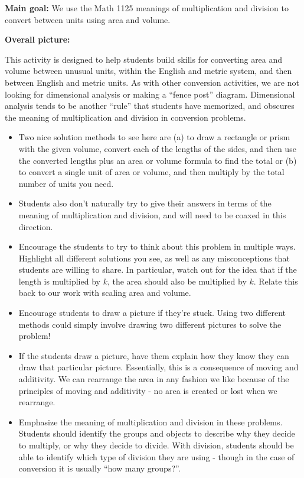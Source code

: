 \documentclass[nooutcomes,noauthor, handout]{ximera}
\begin{document}
\begin{instructorNotes}

{\bf Main goal:} We use the Math 1125 meanings of multiplication and division to convert between units using area and volume.

{\bf Overall picture:} 

This activity is designed to help students build skills for converting area and volume between unusual units, within the English and metric system, and then between English and metric units.  As with other conversion activities, we are not looking for dimensional analysis or making a ``fence post'' diagram. Dimensional analysis tends to be another ``rule'' that students have memorized, and obscures the meaning of multiplication and division in conversion problems.


\begin{itemize}
\item Two nice solution methods to see here are (a) to draw a rectangle or prism with the given volume, convert each of the lengths of the sides, and then use the converted lengths plus an area or volume formula to find the total or (b) to convert a single unit of area or volume, and then multiply by the total number of units you need.

\item Students also don't naturally try to give their answers in terms of the meaning of multiplication and division, and will need to be coaxed in this direction.

	\item Encourage the students to try to think about this problem in multiple ways.   Highlight all different solutions you see, as well as any misconceptions that students are willing to share. In particular, watch out for the idea that if the length is multiplied by $k$, the area should also be multiplied by $k$. Relate this back to our work with scaling area and volume. 
	\item Encourage students to draw a picture if they're stuck.  Using two different methods could simply involve drawing two different pictures to solve the problem!
	\item If the students draw a picture, have them explain how they know they can draw that particular picture.  Essentially, this is a consequence of moving and additivity.  We can rearrange the area in any fashion we like because of the principles of moving and additivity - no area is created or lost when we rearrange. 
	\item Emphasize the meaning of multiplication and division in these problems.  Students should identify the groups and objects to describe why they decide to multiply, or why they decide to divide.  With division, students should be able to identify which type of division they are using - though in the case of conversion it is usually ``how many groups?''.
\end{itemize}



\end{instructorNotes}
\end{document}

